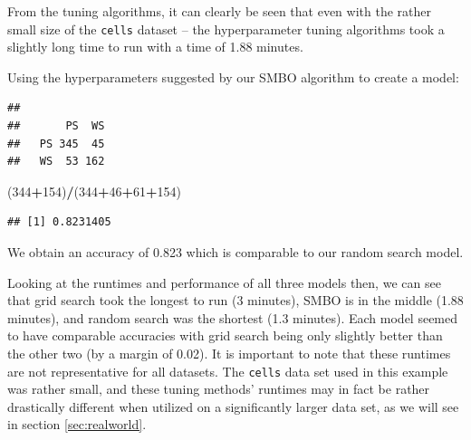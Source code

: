 \documentclass[12pt]{article}
\newenvironment{Shaded}{\begin{snugshade}}{\end{snugshade}}
\newcommand{\CommentTok}[1]{\textcolor[rgb]{0.56,0.35,0.01}{\textit{#1}}}
\newcommand{\DataTypeTok}[1]{\textcolor[rgb]{0.13,0.29,0.53}{#1}}
\newcommand{\DecValTok}[1]{\textcolor[rgb]{0.00,0.00,0.81}{#1}}
\newcommand{\FloatTok}[1]{\textcolor[rgb]{0.00,0.00,0.81}{#1}}
\newcommand{\KeywordTok}[1]{\textcolor[rgb]{0.13,0.29,0.53}{\textbf{#1}}}
\newcommand{\NormalTok}[1]{#1}
\newcommand{\OperatorTok}[1]{\textcolor[rgb]{0.81,0.36,0.00}{\textbf{#1}}}
\newcommand{\StringTok}[1]{\textcolor[rgb]{0.31,0.60,0.02}{#1}}
\begin{document}
From the tuning algorithms, it can clearly be seen that even with the
rather small size of the \texttt{cells} dataset -- the hyperparameter
tuning algorithms took a slightly long time to run with a time of 1.88
minutes.

Using the hyperparameters suggested by our SMBO algorithm to create a
model:

\begin{Shaded}
\end{Shaded}

\begin{verbatim}
##     
##       PS  WS
##   PS 345  45
##   WS  53 162
\end{verbatim}

\begin{Shaded}
\begin{Highlighting}[]
\NormalTok{(}\DecValTok{344}\OperatorTok{+}\DecValTok{154}\NormalTok{)}\OperatorTok{/}\NormalTok{(}\DecValTok{344}\OperatorTok{+}\DecValTok{46}\OperatorTok{+}\DecValTok{61}\OperatorTok{+}\DecValTok{154}\NormalTok{)}
\end{Highlighting}
\end{Shaded}

\begin{verbatim}
## [1] 0.8231405
\end{verbatim}

We obtain an accuracy of 0.823 which is comparable to our random search
model.

Looking at the runtimes and performance of all three models then, we can
see that grid search took the longest to run (3 minutes), SMBO is in the
middle (1.88 minutes), and random search was the shortest (1.3 minutes).
Each model seemed to have comparable accuracies with grid search being
only slightly better than the other two (by a margin of 0.02). It is
important to note that these runtimes are not representative for all
datasets. The \texttt{cells} data set used in this example was rather
small, and these tuning methods' runtimes may in fact be rather
drastically different when utilized on a significantly larger data set,
as we will see in section \ref{sec:realworld}.
\end{document}
